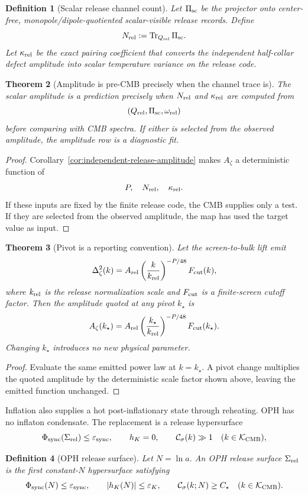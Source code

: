 \documentclass[11pt]{article}
\newtheorem{theorem}{Theorem}[section]
\newtheorem{definition}[theorem]{Definition}
\begin{document}
\begin{definition}[Scalar release channel count]\label{def:scalar-release-channel-count}
Let \(\Pi_{\rm sc}\) be the projector onto center-free, monopole/dipole-quotiented scalar-visible
release records. Define
\[
N_{\rm rel}:=\operatorname{Tr}_{Q_{\rm rel}}\Pi_{\rm sc}.
\]
Let \(\kappa_{\rm rel}\) be the exact pairing coefficient that converts the independent
half-collar defect amplitude into scalar temperature variance on the release code.
\end{definition}

\begin{theorem}[Amplitude is pre-CMB precisely when the channel trace is]\label{thm:amplitude-pre-cmb}
The scalar amplitude is a prediction precisely when \(N_{\rm rel}\) and \(\kappa_{\rm rel}\) are
computed from
\[
(Q_{\rm rel},\Pi_{\rm sc},\omega_{\rm rel})
\]
before comparing with CMB spectra. If either is selected from the observed amplitude, the amplitude
row is a diagnostic fit.
\end{theorem}

\begin{proof}
Corollary~\ref{cor:independent-release-amplitude} makes \(A_\zeta\) a deterministic function of
\[
P,\quad N_{\rm rel},\quad \kappa_{\rm rel}.
\]
If these inputs are fixed by the finite release code, the CMB supplies only a test. If they are
selected from the observed amplitude, the map has used the target value as input.
\end{proof}

\begin{theorem}[Pivot is a reporting convention]\label{thm:pivot-convention}
Let the screen-to-bulk lift emit
\[
\Delta_\zeta^2(k)
=
A_{\rm rel}
\left(\frac{k}{k_{\rm rel}}\right)^{-P/48}
F_{\rm cut}(k),
\]
where \(k_{\rm rel}\) is the release normalization scale and \(F_{\rm cut}\) is a finite-screen
cutoff factor. Then the amplitude quoted at any pivot \(k_\star\) is
\[
A_\zeta(k_\star)
=
A_{\rm rel}
\left(\frac{k_\star}{k_{\rm rel}}\right)^{-P/48}
F_{\rm cut}(k_\star).
\]
Changing \(k_\star\) introduces no new physical parameter.
\end{theorem}

\begin{proof}
Evaluate the same emitted power law at \(k=k_\star\). A pivot change multiplies the quoted amplitude
by the deterministic scale factor shown above, leaving the emitted function unchanged.
\end{proof}

Inflation also supplies a hot post-inflationary state through reheating. OPH has no inflaton
condensate. The replacement is a release hypersurface
\[
\Phi_{\rm sync}(\Sigma_{\rm rel})\le\varepsilon_{\rm sync},
\qquad
h_K=0,
\qquad
\mathcal C_\sigma(k)\gg1
\quad(k\in\mathcal K_{\rm CMB}),
\]
\begin{definition}[OPH release surface]\label{def:release-surface}
Let \(N=\ln a\). An OPH release surface \(\Sigma_{\rm rel}\) is the first constant-\(N\)
hypersurface satisfying
\[
\Phi_{\rm sync}(N)\le\varepsilon_{\rm sync},
\qquad
|h_K(N)|\le\varepsilon_K,
\qquad
\mathcal C_\sigma(k;N)\ge C_\star
\quad(k\in\mathcal K_{\rm CMB}).
\]
\end{definition}
\end{document}
